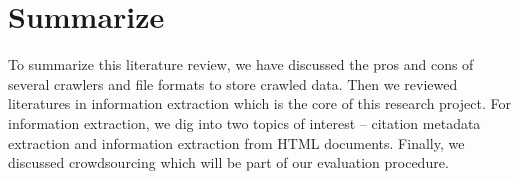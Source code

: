 \documentclass[prodmode]{acmsmall} %
\begin{document}
\section{Summarize}

To summarize this literature review, we have discussed the pros and cons of several crawlers and file formats to store crawled data. Then we reviewed literatures in information extraction which is the core of this research project. For information extraction, we dig into two topics of interest -- citation metadata extraction and information extraction from HTML documents. Finally, we discussed crowdsourcing which will be part of our evaluation procedure.



\end{document}
